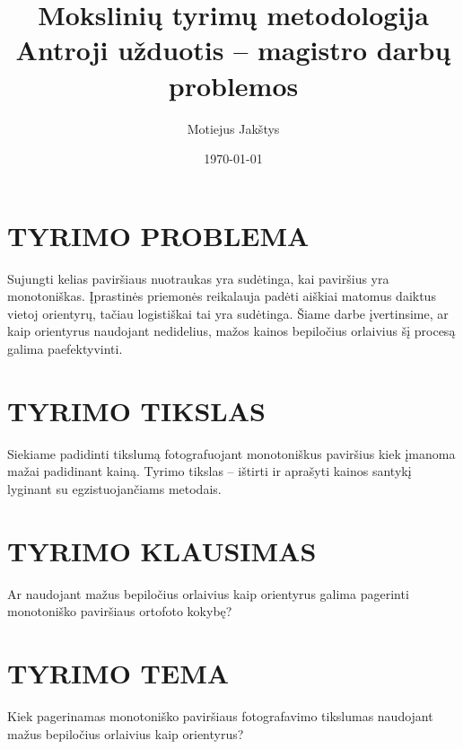 \documentclass{article}
\title{Mokslinių tyrimų metodologija\\ \vspace{4mm} 
Antroji užduotis -- magistro darbų problemos}
\author{Motiejus Jakštys}
\date{\today}
\begin{document}
\maketitle

\section{TYRIMO PROBLEMA}

Sujungti kelias paviršiaus nuotraukas yra sudėtinga, kai paviršius yra
monotoniškas. Įprastinės priemonės reikalauja padėti aiškiai matomus daiktus
vietoj orientyrų, tačiau logistiškai tai yra sudėtinga. Šiame darbe
įvertinsime, ar kaip orientyrus naudojant nedidelius, mažos kainos bepiločius
orlaivius šį procesą galima paefektyvinti.

\section{TYRIMO TIKSLAS}

Siekiame padidinti tikslumą fotografuojant monotoniškus paviršius kiek įmanoma
mažai padidinant kainą. Tyrimo tikslas -- ištirti ir aprašyti kainos santykį
lyginant su egzistuojančiams metodais.

\section{TYRIMO KLAUSIMAS}

Ar naudojant mažus bepiločius orlaivius kaip orientyrus galima pagerinti
monotoniško paviršiaus ortofoto kokybę?

\section{TYRIMO TEMA}

Kiek pagerinamas monotoniško paviršiaus fotografavimo tikslumas naudojant mažus
bepiločius orlaivius kaip orientyrus?
\end{document}
